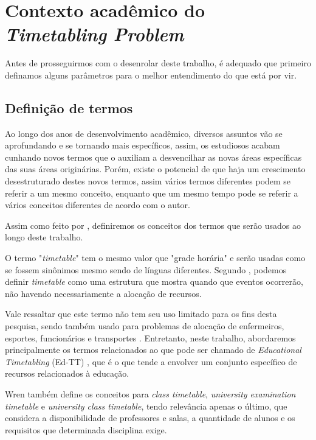 \chapter{Contexto acadêmico do \textit{Timetabling Problem}} %

Antes de prosseguirmos com o desenrolar deste trabalho, é adequado que primeiro definamos alguns parâmetros para o melhor entendimento do que está por vir.

\section{Definição de termos} %

Ao longo dos anos de desenvolvimento acadêmico, diversos assuntos vão se aprofundando e se tornando mais específicos, assim, os estudiosos acabam cunhando novos termos que o auxiliam a desvencilhar as novas áreas específicas das suas áreas originárias. Porém, existe o potencial de que haja um crescimento desestruturado destes novos termos, assim vários termos diferentes podem se referir a um mesmo conceito, enquanto que um mesmo tempo pode se referir a vários conceitos diferentes de acordo com o autor.

Assim como feito por \cite{goos_scheduling_1996}, definiremos os conceitos dos termos que serão usados ao longo deste trabalho.

O termo "\textit{timetable}" tem o mesmo valor que "grade horária" e serão usadas como se fossem sinônimos mesmo sendo de línguas diferentes. Segundo \cite{goos_scheduling_1996}, podemos definir \textit{timetable} como uma estrutura que mostra quando que eventos ocorrerão, não havendo necessariamente a alocação de recursos.

Vale ressaltar que este termo não tem seu uso limitado para os fins desta pesquisa, sendo também usado para problemas de alocação de enfermeiros, esportes, funcionários e transportes \cite{arratia-martinez_university_2021}. Entretanto, neste trabalho, abordaremos principalmente os termos relacionados ao que pode ser chamado de \textit{Educational Timetabling} (Ed-TT) \cite{alencar_visualization_2019}, que é o que tende a envolver um conjunto específico de recursos relacionados à educação.

Wren também define os conceitos para \textit{class timetable}, \textit{university examination timetable} e \textit{university class timetable}, tendo relevância apenas o último, que considera a disponibilidade de professores e salas, a quantidade de alunos e os requisitos que determinada disciplina exige.


